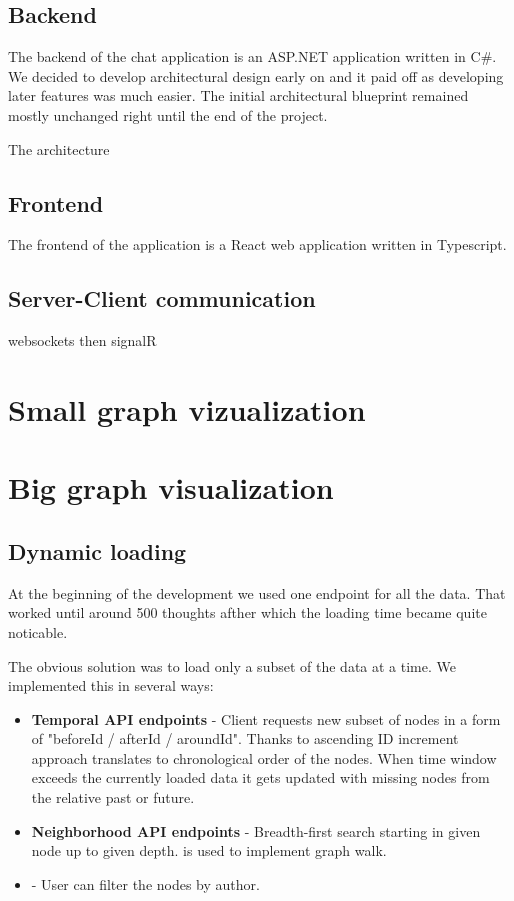 \subsection{Backend}
The backend of the chat application is an ASP.NET application written in C\#.
We decided to develop architectural design early on and it paid off as developing later features was much easier. 
The initial architectural blueprint remained mostly unchanged right until the end of the project.

The architecture 


\subsection{Frontend}
The frontend of the application is a React web application written in Typescript. 

\subsection{Server-Client communication}
websockets then signalR

\section{Small graph vizualization}

\section{Big graph visualization}


\subsection{Dynamic loading}
At the beginning of the development we used one endpoint for all the data. That worked until around 500 thoughts afther which the loading time became quite noticable. 

The obvious solution was to load only a subset of the data at a time. We implemented this in several ways:
\begin{itemize}
    \item \textbf{Temporal API endpoints} - Client requests new subset of nodes in a form of "beforeId / afterId / aroundId".
    Thanks to ascending ID increment approach translates to chronological order of the nodes.
    When time window exceeds the currently loaded data it gets updated with missing nodes from the relative past or future.
    \item \textbf{Neighborhood API endpoints} - Breadth-first search starting in given node up to given depth. is used to implement graph walk.
    \item \textbf{} - User can filter the nodes by author.
\end{itemize}